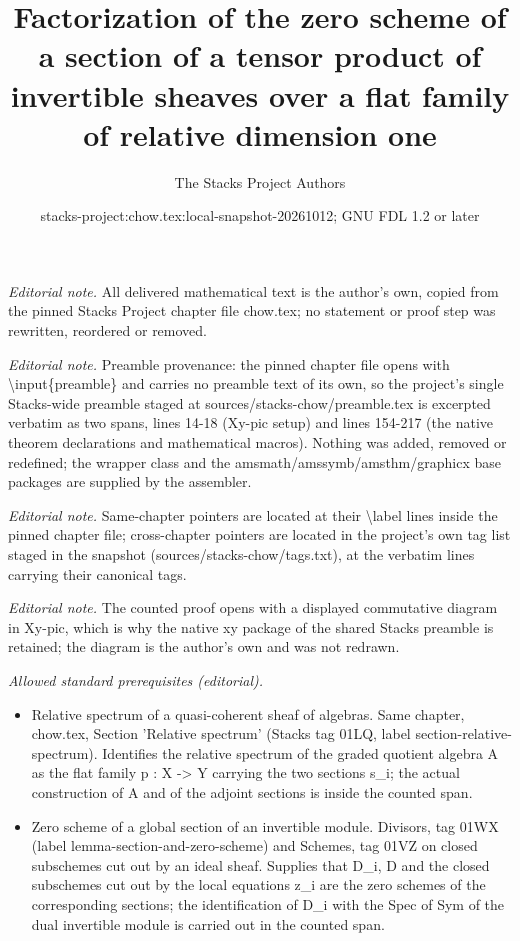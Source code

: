\documentclass[10pt,a4paper]{amsart}
\title{Factorization of the zero scheme of a section of a tensor product of invertible sheaves over a flat family of relative dimension one}
\author{The Stacks Project Authors}
\date{stacks-project:chow.tex:local-snapshot-20261012; GNU FDL 1.2 or later}
\theoremstyle{plain}
\theoremstyle{definition}
\theoremstyle{remark}
\numberwithin{equation}{subsection}
\begin{document}
\maketitle
\noindent\textit{Editorial note.} All delivered mathematical text is the author's own, copied from the pinned Stacks Project chapter file chow.tex; no statement or proof step was rewritten, reordered or removed.\par\medskip
\noindent\textit{Editorial note.} Preamble provenance: the pinned chapter file opens with \textbackslash{}input\{preamble\} and carries no preamble text of its own, so the project's single Stacks-wide preamble staged at sources/stacks-chow/preamble.tex is excerpted verbatim as two spans, lines 14-18 (Xy-pic setup) and lines 154-217 (the native theorem declarations and mathematical macros). Nothing was added, removed or redefined; the wrapper class and the amsmath/amssymb/amsthm/graphicx base packages are supplied by the assembler.\par\medskip
\noindent\textit{Editorial note.} Same-chapter pointers are located at their \textbackslash{}label lines inside the pinned chapter file; cross-chapter pointers are located in the project's own tag list staged in the snapshot (sources/stacks-chow/tags.txt), at the verbatim lines carrying their canonical tags.\par\medskip
\noindent\textit{Editorial note.} The counted proof opens with a displayed commutative diagram in Xy-pic, which is why the native xy package of the shared Stacks preamble is retained; the diagram is the author's own and was not redrawn.\par\medskip
\noindent\textit{Allowed standard prerequisites (editorial).}\begin{itemize}
\item Relative spectrum of a quasi-coherent sheaf of algebras. Same chapter, chow.tex, Section 'Relative spectrum' (Stacks tag 01LQ, label section-relative-spectrum). Identifies the relative spectrum of the graded quotient algebra A as the flat family p : X -> Y carrying the two sections s\_i; the actual construction of A and of the adjoint sections is inside the counted span.
\item Zero scheme of a global section of an invertible module. Divisors, tag 01WX (label lemma-section-and-zero-scheme) and Schemes, tag 01VZ on closed subschemes cut out by an ideal sheaf. Supplies that D\_i, D and the closed subschemes cut out by the local equations z\_i are the zero schemes of the corresponding sections; the identification of D\_i with the Spec of Sym of the dual invertible module is carried out in the counted span.
\end{itemize}\medskip
\end{document}
